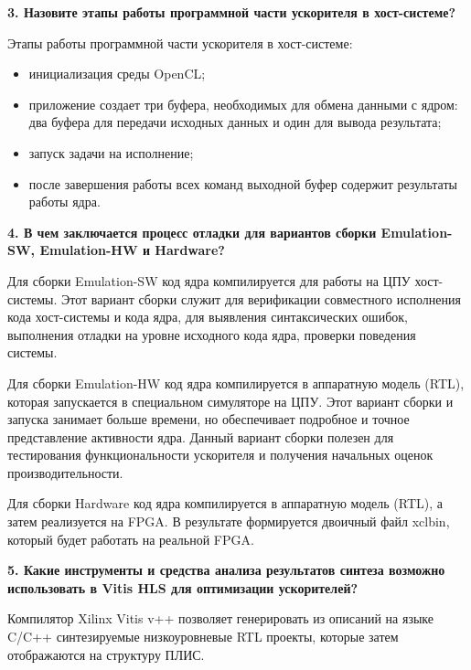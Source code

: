 \textbf{3. Назовите этапы работы программной части ускорителя в хост-системе?}

Этапы работы программной части ускорителя в хост-системе:
\begin{itemize}
	\item инициализация среды OpenCL;
	\item приложение создает три буфера, необходимых для обмена данными с ядром: два буфера для передачи исходных данных и один для вывода результата;
	\item запуск задачи на исполнение;
	\item после завершения работы всех команд выходной буфер 
содержит результаты работы ядра.
\end{itemize}

\textbf{4. В чем заключается процесс отладки для вариантов сборки Emulation-SW, Emulation-HW и Hardware?}

Для сборки Emulation-SW код ядра компилируется
для работы на ЦПУ хост-системы. Этот вариант сборки служит для
верификации совместного исполнения кода хост-системы и кода ядра, для выявления синтаксических ошибок, выполнения отладки на уровне исходного кода ядра, проверки поведения системы.

Для сборки Emulation-HW код ядра компилируется в
аппаратную модель (RTL), которая запускается в специальном симуляторе на ЦПУ. Этот вариант сборки и запуска занимает больше времени, но обеспечивает подробное и точное представление активности ядра. Данный вариант сборки полезен для тестирования функциональности ускорителя и получения начальных оценок производительности.

Для сборки Hardware код ядра компилируется в аппаратную модель (RTL), а затем реализуется на FPGA. В результате формируется двоичный файл xclbin, который будет работать на реальной FPGA.

\textbf{5. Какие инструменты и средства анализа результатов синтеза возможно использовать в Vitis HLS для оптимизации ускорителей?}

Компилятор Xilinx Vitis v++ позволяет генерировать из описаний на языке C/C++ синтезируемые низкоуровневые RTL проекты, которые затем отображаются на структуру ПЛИС.